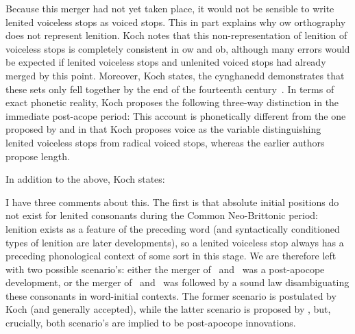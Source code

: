 Because this merger had not yet taken place, it would not be sensible to write lenited voiceless stops as voiced stops. This in part explains why \gls{ow} orthography does not represent lenition. Koch notes that this non-representation of lenition of voiceless stops is completely consistent in \gls{ow} and \gls{ob}, although many errors would be expected if lenited voiceless stops and unlenited voiced stops had already merged by this point. Moreover, Koch states, the cynghanedd demonstrates that these sets only fell together by the end of the fourteenth century~\autocite[\S26]{koch_*cothairche_1990}. In terms of exact phonetic reality, Koch proposes the following three-way distinction in the immediate post-acope period:  This account is phonetically different from the one proposed by \textcite{falchun_systeme_1951} and \textcite{jackson_language_1953} in that Koch proposes voice as the variable distinguishing lenited voiceless stops from radical voiced stops, whereas the earlier authors propose length. 

In addition to the above, Koch states:

I have three comments about this. The first is that absolute initial positions do not exist for lenited consonants during the Common Neo-Brittonic period: lenition exists as a feature of the preceding word (and syntactically conditioned types of lenition are later developments), so a lenited voiceless stop always has a preceding phonological context of some sort in this stage.  We are therefore left with two possible scenario's: either the merger of \xD\ and \lT\ was a post-apocope development, or the merger of \xD\ and \lT\ was followed by a sound law disambiguating these consonants in word-initial contexts. The former scenario is postulated by Koch (and generally accepted), while the latter scenario is proposed by \textcite{harvey_aspects_1984}, but, crucially, both scenario's are implied to be post-apocope innovations.


